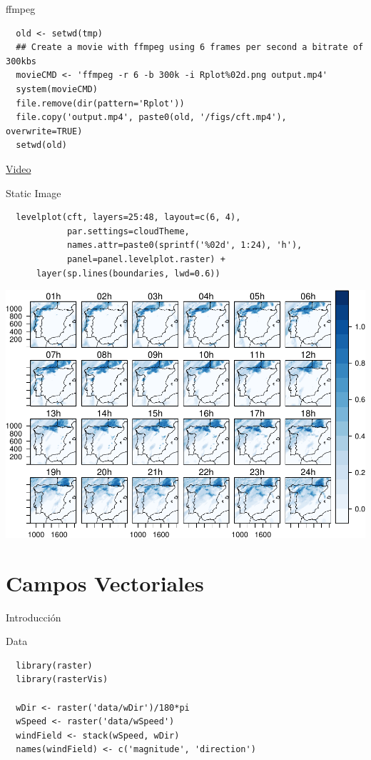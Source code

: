 \documentclass[xcolor={usenames,svgnames,dvipsnames}]{beamer}
\begin{document}
\begin{frame}[fragile,label=sec-4-17]{ffmpeg}
 \lstset{language=R,label= ,caption= ,numbers=none}
\begin{lstlisting}
  old <- setwd(tmp)
  ## Create a movie with ffmpeg using 6 frames per second a bitrate of 300kbs
  movieCMD <- 'ffmpeg -r 6 -b 300k -i Rplot%02d.png output.mp4'
  system(movieCMD)
  file.remove(dir(pattern='Rplot'))
  file.copy('output.mp4', paste0(old, '/figs/cft.mp4'), overwrite=TRUE)
  setwd(old)
\end{lstlisting}

\href{http://vimeo.com/user18057623/cft}{Video}
\end{frame}

\begin{frame}[fragile,label=sec-4-18]{Static Image}
 \lstset{language=R,label= ,caption= ,numbers=none}
\begin{lstlisting}
  levelplot(cft, layers=25:48, layout=c(6, 4),
            par.settings=cloudTheme,
            names.attr=paste0(sprintf('%02d', 1:24), 'h'),
            panel=panel.levelplot.raster) +
      layer(sp.lines(boundaries, lwd=0.6))
\end{lstlisting}

\includegraphics[width=.9\linewidth]{figs/cft.pdf}
\end{frame}


\section{Campos Vectoriales}
\label{sec-5}
\begin{frame}[label=sec-5-1]{Introducción}
\end{frame}

\begin{frame}[fragile,label=sec-5-2]{Data}
 \lstset{language=R,label= ,caption= ,numbers=none}
\begin{lstlisting}
  library(raster)
  library(rasterVis)
  
  wDir <- raster('data/wDir')/180*pi
  wSpeed <- raster('data/wSpeed')
  windField <- stack(wSpeed, wDir)
  names(windField) <- c('magnitude', 'direction')
\end{lstlisting}
\end{frame}
\end{document}
